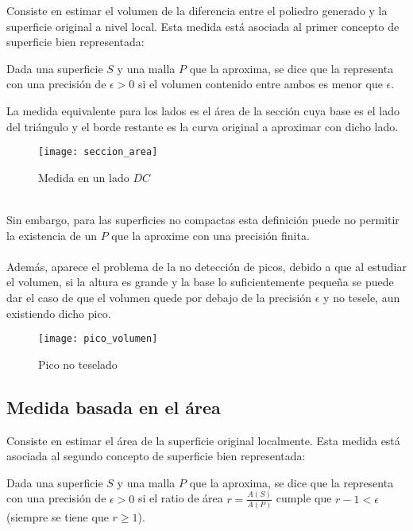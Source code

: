 	Consiste en estimar el volumen de la diferencia entre el poliedro generado y la superficie original a nivel local. Esta medida está asociada al primer concepto de superficie bien representada:
	\begin{definicion}
		Dada una superficie $S$ y una malla $P$ que la aproxima, se dice que la representa con una precisión de $\epsilon > 0$ si el volumen contenido entre ambos es menor que $\epsilon$.
	\end{definicion}
	La medida equivalente para los lados es el área de la sección cuya base es el lado del triángulo y el borde restante es la curva original a aproximar con dicho lado.\\ 
	\begin{figure}[h]
  		\centering
  		\texttt{[image: seccion\_area]}
  		\caption{Medida en un lado $DC$}
  		\label{fig:seccion_area}
	\end{figure}
	\\ Sin embargo, para las superficies no compactas esta definición puede no permitir la existencia de un $P$ que la aproxime con una precisión finita.\\
	\\ Además, aparece el problema de la no detección de picos, debido a que al estudiar el volumen, si la altura es grande y la base lo suficientemente pequeña se puede dar el caso de que el volumen quede por debajo de la precisión $\epsilon$ y no tesele, aun existiendo dicho pico.
	\begin{figure}[h]
  		\centering
  		\texttt{[image: pico\_volumen]}
  		\caption{Pico no teselado}
  		\label{fig:pico_volumen}
	\end{figure}
	
	\subsection*{Medida basada en el área}
	
	Consiste en estimar el área de la superficie original localmente. Esta medida está asociada al segundo concepto de superficie bien representada:
	\begin{definicion}
		Dada una superficie $S$ y una malla $P$ que la aproxima, se dice que la representa con una precisión de $\epsilon > 0$ si el ratio de área $r=\frac{A(S)} {A(P)}$ cumple que $r-1 < \epsilon$ (siempre se tiene que $r\geq 1$).
	\end{definicion}
	

